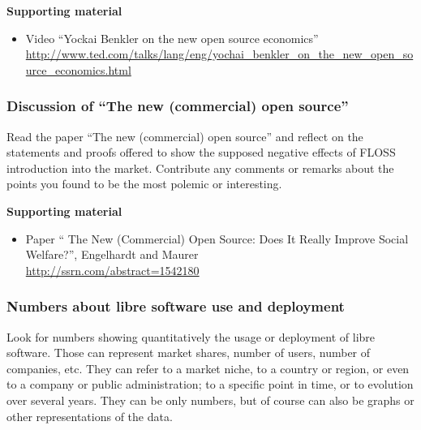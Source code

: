 \documentclass[a4paper]{article}
\begin{document}
\textbf{Supporting material}

\begin{itemize}
\item Video ``Yockai Benkler on the new open source economics'' \\
  \url{http://www.ted.com/talks/lang/eng/yochai_benkler_on_the_new_open_source_economics.html}
\end{itemize}

\subsubsection{Discussion of ``The new (commercial) open source''}
\label{sub:new-oss}

Read the paper ``The new (commercial) open source'' and reflect on the statements and proofs offered to show the supposed negative effects of FLOSS introduction into the market. Contribute any comments or remarks about the points you found to be the most polemic or interesting.

\textbf{Supporting material}

\begin{itemize}
\item Paper `` The New (Commercial) Open Source: Does It Really Improve Social Welfare?'', Engelhardt and Maurer \\
  \url{http://ssrn.com/abstract=1542180}
\end{itemize}

\subsubsection{Numbers about libre software use and deployment}
\label{sub:numbers-use}

Look for numbers showing quantitatively the usage or deployment of libre software. Those can represent market shares, number of users, number of companies, etc. They can refer to a market niche, to a country or region, or even to a company or public administration; to a specific point in time, or to evolution over several years. They can be only numbers, but of course can also be graphs or other representations of the data.
\end{document}
